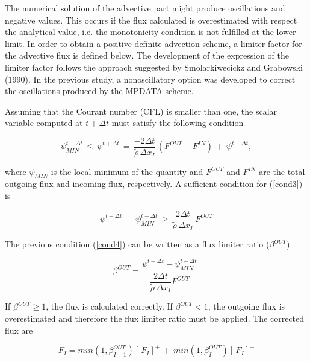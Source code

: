 The numerical solution of the advective part might produce oscillations and
negative values. This occurs if
the flux calculated is overestimated with respect the analytical value, i.e. the
monotonicity condition is not fulfilled at the lower limit. In order to obtain a
positive definite advection scheme, a limiter factor for the advective flux is
defined below. The development of the expression of the limiter factor follows
the approach suggested by Smolarkiwecickz and Grabowski (1990). In the previous
study, a nonoscillatory option was developed to correct the oscillations produced by
the MPDATA scheme.

Assuming that the Courant number (CFL) is
smaller than one, the scalar variable computed at $t+\Delta t$ must satisfy the
following condition

\begin{equation}
\label{cond3}
\psi_{MIN}^{t-\Delta t}\,\leq \,
\psi^{t+\Delta t} \, = \,
\dfrac{-2 \Delta t}{\tilde{\rho}\,\Delta \overline{x}_{I}}\, (F^{OUT}-F^{IN}) \,+\,
\psi^{t-\Delta t},
\end{equation}

\noindent where $\psi_{MIN}$ is the local minimum of the quantity and $F^{OUT}$ and $F^{IN}$ are
the total
outgoing flux and incoming flux, respectively. A sufficient condition for (\ref{cond3}) is

\begin{equation}
\label{cond4}
\psi^{t-\Delta t}  \, - \,
\psi_{MIN}^{t-\Delta t}\,\geq \,
\dfrac{2 \Delta t}{\tilde{\rho}\,\Delta \overline{x}_{I}}\, F^{OUT}
\end{equation}

The previous condition (\ref{cond4}) can be written as a flux limiter ratio ($\beta^{OUT}$)

\begin{equation}
\beta^{OUT}=
 \dfrac{ \psi^{t-\Delta t}- \psi_{MIN}^{t-\Delta t} }
{ \dfrac{2 \Delta t}{\tilde{\rho}\,\Delta \overline{x}_{I}} {F}^{OUT}}.
\end{equation}

If $\beta^{OUT} \geq 1$, the flux is calculated correctly.
If $\beta^{OUT}<1$, the outgoing flux is overestimated and therefore the flux limiter
ratio must be applied.
The corrected flux are

\begin{equation}
\label{cond5}
{F}_{I} = min(1,\beta^{OUT}_{I-1})[\,F_{I}]^{+}\,+\,
min(1,\beta^{OUT}_{I})[\,F_{I}]^{-}
\end{equation}

